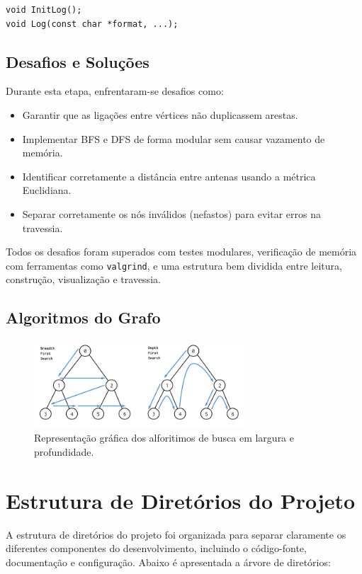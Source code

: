 \documentclass[a4paper,12pt]{article}
\begin{document}
\begin{lstlisting}[style=CStyle]
void InitLog();
void Log(const char *format, ...);
\end{lstlisting}

\subsection{Desafios e Soluções}
Durante esta etapa, enfrentaram-se desafios como:
\begin{itemize}
    \item Garantir que as ligações entre vértices não duplicassem arestas.
    \item Implementar BFS e DFS de forma modular sem causar vazamento de memória.
    \item Identificar corretamente a distância entre antenas usando a métrica Euclidiana.
    \item Separar corretamente os nós inválidos (nefastos) para evitar erros na travessia.
\end{itemize}

Todos os desafios foram superados com testes modulares, verificação de memória com ferramentas como \texttt{valgrind}, e uma estrutura bem dividida entre leitura, construção, visualização e travessia.

\subsection{Algoritmos do Grafo}
\begin{figure}[h!]
    \centering
    \includegraphics[width=0.7\textwidth]{grafo.png}
    \caption{Representação gráfica dos alforitimos de busca em largura e profundidade.}
\end{figure}
\newpage


\section{Estrutura de Diretórios do Projeto}

A estrutura de diretórios do projeto foi organizada para separar claramente os diferentes componentes do desenvolvimento, incluindo o código-fonte, documentação e configuração. Abaixo é apresentada a árvore de diretórios:
\end{document}
